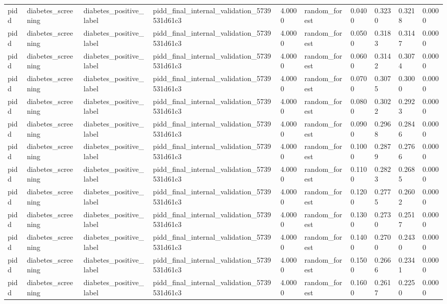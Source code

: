\begin{tabular}{llllllllll}
pidd & diabetes\_screening & diabetes\_positive\_label & pidd\_final\_internal\_validation\_5739531d61c3 & 4.0000 & random\_forest & 0.0400 & 0.3230 & 0.3218 & 0.0000 \\
pidd & diabetes\_screening & diabetes\_positive\_label & pidd\_final\_internal\_validation\_5739531d61c3 & 4.0000 & random\_forest & 0.0500 & 0.3183 & 0.3147 & 0.0000 \\
pidd & diabetes\_screening & diabetes\_positive\_label & pidd\_final\_internal\_validation\_5739531d61c3 & 4.0000 & random\_forest & 0.0600 & 0.3142 & 0.3074 & 0.0000 \\
pidd & diabetes\_screening & diabetes\_positive\_label & pidd\_final\_internal\_validation\_5739531d61c3 & 4.0000 & random\_forest & 0.0700 & 0.3075 & 0.3000 & 0.0000 \\
pidd & diabetes\_screening & diabetes\_positive\_label & pidd\_final\_internal\_validation\_5739531d61c3 & 4.0000 & random\_forest & 0.0800 & 0.3022 & 0.2923 & 0.0000 \\
pidd & diabetes\_screening & diabetes\_positive\_label & pidd\_final\_internal\_validation\_5739531d61c3 & 4.0000 & random\_forest & 0.0900 & 0.2968 & 0.2846 & 0.0000 \\
pidd & diabetes\_screening & diabetes\_positive\_label & pidd\_final\_internal\_validation\_5739531d61c3 & 4.0000 & random\_forest & 0.1000 & 0.2879 & 0.2766 & 0.0000 \\
pidd & diabetes\_screening & diabetes\_positive\_label & pidd\_final\_internal\_validation\_5739531d61c3 & 4.0000 & random\_forest & 0.1100 & 0.2823 & 0.2685 & 0.0000 \\
pidd & diabetes\_screening & diabetes\_positive\_label & pidd\_final\_internal\_validation\_5739531d61c3 & 4.0000 & random\_forest & 0.1200 & 0.2775 & 0.2602 & 0.0000 \\
pidd & diabetes\_screening & diabetes\_positive\_label & pidd\_final\_internal\_validation\_5739531d61c3 & 4.0000 & random\_forest & 0.1300 & 0.2730 & 0.2517 & 0.0000 \\
pidd & diabetes\_screening & diabetes\_positive\_label & pidd\_final\_internal\_validation\_5739531d61c3 & 4.0000 & random\_forest & 0.1400 & 0.2700 & 0.2430 & 0.0000 \\
pidd & diabetes\_screening & diabetes\_positive\_label & pidd\_final\_internal\_validation\_5739531d61c3 & 4.0000 & random\_forest & 0.1500 & 0.2666 & 0.2341 & 0.0000 \\
pidd & diabetes\_screening & diabetes\_positive\_label & pidd\_final\_internal\_validation\_5739531d61c3 & 4.0000 & random\_forest & 0.1600 & 0.2617 & 0.2250 & 0.0000 \\

\end{tabular}
